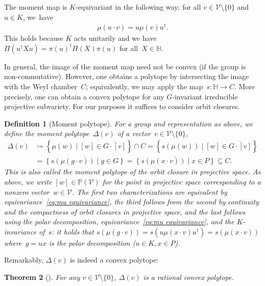\documentclass[11pt,letterpaper]{article}
\newtheorem{theorem}{Theorem}[section]
\newtheorem{definition}[theorem]{Definition}\AddToHook{env/definition/begin}{\crefalias{theorem}{definition}}
\numberwithin{equation}{section}
\newcommand{\bbH}{\mathbb{H}}
\newcommand{\bbP}{\mathbb{P}}
\newcommand{\VV}{\mathcal{V}}
\begin{document}
The moment map is $K$-equivariant in the following way: for all $v \in \VV\setminus\{0\}$ and $u \in K$, we~have
\begin{align}\label{eq:mu equivariance}
    \mu(u \cdot v) = u \mu(v) u^\dagger.
\end{align}
This holds because $K$ acts unitarily and we have $\Pi(u^\dagger X u) = \pi(u)^\dagger \Pi(X) \pi(u)$ for all~$X \in \bbH$.

In general, the image of the moment map need not be convex (if the group is non-commutative).
However, one obtains a polytope by intersecting the image with the Weyl chamber~$C$; equivalently, we may apply the map~$s \colon \bbH \to C$.
More precisely, one can obtain a convex polytope for any $G$-invariant irreducible projective subvariety.
For our purposes it suffices to consider orbit closures.

\begin{definition}[Moment polytope]
For a group and representation as above, we define the \emph{moment polytope}~$\Delta(v)$ of a vector~$v \in \VV\setminus\{0\}$,
\begin{equation}\label{eq:momentpolytope}
\begin{aligned}
    \Delta(v)
&\coloneqq \left\{ \mu(w) \mid [w] \in \overline{G \cdot [v]} \right\} \cap C
= \left\{ s(\mu(w)) \mid [w] \in \overline{G \cdot [v]} \right\} \\
&= \overline{ \left\{ s(\mu(g \cdot v)) \mid g \in G \right\} }
= \overline{ \left\{ s(\mu(x \cdot v)) \mid x \in P \right\} } \subseteq C.
\end{aligned}
\end{equation}
This is also called the moment polytope of the orbit closure in projective space.
As above, we write $[w] \in \bbP(\VV)$ for the point in projective space corresponding to a nonzero vector~$w\in\VV$.
The first two characterizations are equivalent by equivariance~\eqref{eq:mu equivariance}, the third follows from the second by continuity and the compactness of orbit closures in projective space, and the last follows using the polar decomposition, equivariance~\eqref{eq:mu equivariance}, and the $K$-invariance of~$s$:
it holds that $s(\mu(g \cdot v)) = s(u \mu(x \cdot v) u^\dagger) = s(\mu(x \cdot v))$ where~$g = ux$ is the polar decomposition ($u \in K, x \in P$).
\end{definition}

Remarkably, $\Delta(v)$ is indeed a convex polytope:

\begin{theorem}[\cite{NessMumford1984,Kirwan1984}]
    For any $v\in\VV\setminus\{0\}$, $\Delta(v)$ is a rational convex polytope.
\end{theorem}
\end{document}
